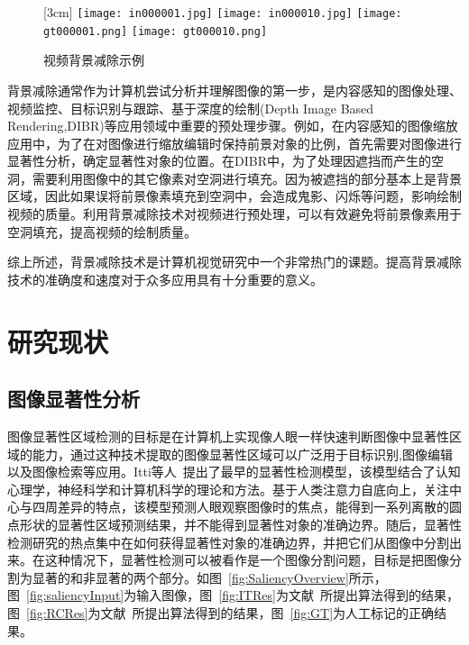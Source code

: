 \begin{figure}[ht]
  \centering%
  [3cm] %
    {\texttt{[image: in000001.jpg]}}%
  \hspace{1em}%
      {\texttt{[image: in000010.jpg]}}
  \hspace{1em}%
      {\texttt{[image: gt000001.png]}}
   \hspace{1em}%
    {\texttt{[image: gt000010.png]}}

  \caption{视频背景减除示例}
  \label{fig:videoBS}
\end{figure}
\par

背景减除通常作为计算机尝试分析并理解图像的第一步，是内容感知的图像处理、视频监控、目标识别与跟踪、基于深度的绘制(Depth Image Based Rendering,DIBR)等应用领域中重要的预处理步骤。例如，在内容感知的图像缩放应用中，为了在对图像进行缩放编辑时保持前景对象的比例，首先需要对图像进行显著性分析，确定显著性对象的位置。在DIBR中，为了处理因遮挡而产生的空洞，需要利用图像中的其它像素对空洞进行填充。因为被遮挡的部分基本上是背景区域，因此如果误将前景像素填充到空洞中，会造成鬼影、闪烁等问题，影响绘制视频的质量。利用背景减除技术对视频进行预处理，可以有效避免将前景像素用于空洞填充，提高视频的绘制质量。\par

综上所述，背景减除技术是计算机视觉研究中一个非常热门的课题。提高背景减除技术的准确度和速度对于众多应用具有十分重要的意义。
\section{研究现状}
\label{sec:second}
\subsection{图像显著性分析}
\label{sec:imageSaliency}
图像显著性区域检测的目标是在计算机上实现像人眼一样快速判断图像中显著性区域的能力，通过这种技术提取的图像显著性区域可以广泛用于目标识别,图像编辑以及图像检索等应用。Itti等人~\cite{itti}提出了最早的显著性检测模型，该模型结合了认知心理学，神经科学和计算机科学的理论和方法。基于人类注意力自底向上，关注中心与四周差异的特点，该模型预测人眼观察图像时的焦点，能得到一系列离散的圆点形状的显著性区域预测结果，并不能得到显著性对象的准确边界。随后，显著性检测研究的热点集中在如何获得显著性对象的准确边界，并把它们从图像中分割出来。在这种情况下，显著性检测可以被看作是一个图像分割问题，目标是把图像分割为显著的和非显著的两个部分。如图~\ref{fig:SaliencyOverview}所示，图~\ref{fig:saliencyInput}为输入图像，图~\ref{fig:ITRes}为文献~所提出算法得到的结果，图~\ref{fig:RCRes}为文献~所提出算法得到的结果，图~\ref{fig:GT}为人工标记的正确结果。

